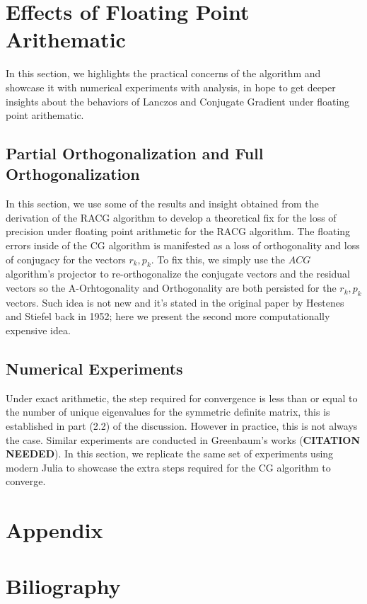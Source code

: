 \documentclass[]{article}
\theoremstyle{definition}
\begin{document}
        
\section{Effects of Floating Point Arithematic}
    In this section, we highlights the practical concerns of the algorithm and showcase it with numerical experiments with analysis, in hope to get deeper insights about the behaviors of Lanczos and Conjugate Gradient under floating point arithematic. 
    \subsection{Partial Orthogonalization and Full Orthogonalization}
        In this section, we use some of the results and insight obtained from the derivation of the RACG algorithm to develop a theoretical fix for the loss of precision under floating point arithmetic for the RACG algorithm. The floating errors inside of the CG algorithm is manifested as a loss of orthogonality and loss of conjugacy for the vectors $r_k, p_k$. To fix this, we simply use the $ACG$ algorithm's projector to re-orthogonalize the conjugate vectors and the residual vectors so the A-Orhtogonality and Orthogonality are both persisted for the $r_k, p_k$ vectors. Such idea is not new and it's stated in the original paper by Hestenes and Stiefel back in 1952; here we present the second more computationally expensive idea. 


    \subsection{Numerical Experiments}
        Under exact arithmetic, the step required for convergence is less than or equal to the number of unique eigenvalues for the symmetric definite matrix, this is established in part (2.2) of the discussion. However in practice, this is not always the case. Similar experiments are conducted in Greenbaum's works (\textbf{CITATION NEEDED}). In this section, we replicate the same set of experiments using modern Julia to showcase the extra steps required for the CG algorithm to converge. 
    
    

        
        
\section{Appendix}
\section{Biliography}
            
            
\end{document}
